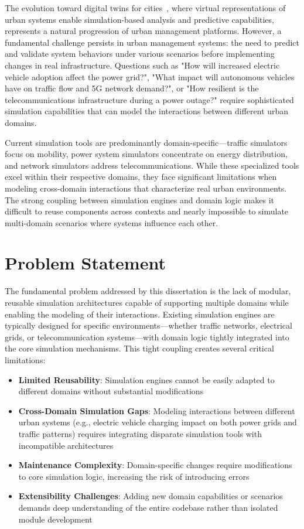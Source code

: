 The evolution toward digital twins for cities~\cite{digital_twin_cities}, where virtual representations of urban systems enable simulation-based analysis and predictive capabilities, represents a natural progression of urban management platforms. However, a fundamental challenge persists in urban management systems: the need to predict and validate system behaviors under various scenarios before implementing changes in real infrastructure. Questions such as "How will increased electric vehicle adoption affect the power grid?", "What impact will autonomous vehicles have on traffic flow and 5G network demand?", or "How resilient is the telecommunications infrastructure during a power outage?" require sophisticated simulation capabilities that can model the interactions between different urban domains.

Current simulation tools are predominantly domain-specific—traffic simulators focus on mobility, power system simulators concentrate on energy distribution, and network simulators address telecommunications. While these specialized tools excel within their respective domains, they face significant limitations when modeling cross-domain interactions that characterize real urban environments. The strong coupling between simulation engines and domain logic makes it difficult to reuse components across contexts and nearly impossible to simulate multi-domain scenarios where systems influence each other.


\section{Problem Statement}

The fundamental problem addressed by this dissertation is the lack of modular, reusable simulation architectures capable of supporting multiple domains while enabling the modeling of their interactions. Existing simulation engines are typically designed for specific environments—whether traffic networks, electrical grids, or telecommunication systems—with domain logic tightly integrated into the core simulation mechanisms. This tight coupling creates several critical limitations:

\begin{itemize}
    \item \textbf{Limited Reusability}: Simulation engines cannot be easily adapted to different domains without substantial modifications
    \item \textbf{Cross-Domain Simulation Gaps}: Modeling interactions between different urban systems (e.g., electric vehicle charging impact on both power grids and traffic patterns) requires integrating disparate simulation tools with incompatible architectures
    \item \textbf{Maintenance Complexity}: Domain-specific changes require modifications to core simulation logic, increasing the risk of introducing errors
    \item \textbf{Extensibility Challenges}: Adding new domain capabilities or scenarios demands deep understanding of the entire codebase rather than isolated module development
\end{itemize}

